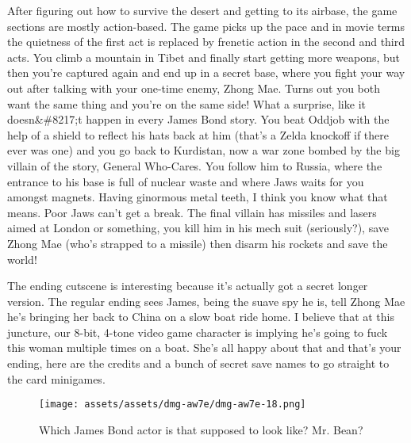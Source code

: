 \documentclass{book}
\let\oldcenter\center
\let\oldendcenter\endcenter
\renewenvironment{center}{\setlength\topsep{0pt}\oldcenter}{\oldendcenter}
\begin{document}
\begin{center}
\vspace{8pt}
\quad\vspace{4pt}
\end{center}
After figuring out how to survive the desert and getting to its airbase, the game sections are mostly action-based. The game picks up the pace and in movie terms the quietness of the first act is replaced by frenetic action in the second and third acts. You climb a mountain in Tibet and finally start getting more weapons, but then you’re captured again and end up in a secret base, where you fight your way out after talking with your one-time enemy, Zhong Mae. Turns out you both want the same thing and you’re on the same side! What a surprise, like it doesn&\#8217;t happen in every James Bond story. You beat Oddjob with the help of a shield to reflect his hats back at him (that’s a Zelda knockoff if there ever was one) and you go back to Kurdistan, now a war zone bombed by the big villain of the story, General Who-Cares. You follow him to Russia, where the entrance to his base is full of nuclear waste and where Jaws waits for you amongst magnets. Having ginormous metal teeth, I think you know what that means. Poor Jaws can’t get a break. The final villain has missiles and lasers aimed at London or something, you kill him in his mech suit (seriously?), save Zhong Mae (who’s strapped to a missile) then disarm his rockets and save the world!

The ending cutscene is interesting because it’s actually got a secret longer version. The regular ending sees James, being the suave spy he is, tell Zhong Mae he’s bringing her back to China on a slow boat ride home. I believe that at this juncture, our 8-bit, 4-tone video game character is implying he’s going to fuck this woman multiple times on a boat. She’s all happy about that and that’s your ending, here are the credits and a bunch of secret save names to go straight to the card minigames.

\begin{figure}[hbt]
\vskip 10pt
\centering \texttt{[image: assets/assets/dmg-aw7e/dmg-aw7e-18.png]}\par\pagetwodescription Which James Bond actor is that supposed to look like? Mr. Bean?
\vskip 6pt
\end{figure}
\end{document}
